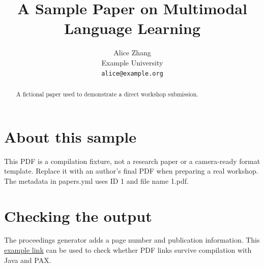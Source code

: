 \documentclass[11pt,a4paper]{article}
\title{A Sample Paper on Multimodal Language Learning}
\author{Alice Zhang\\Example University\\\texttt{alice@example.org}}
\date{}
\begin{document}
\maketitle
\thispagestyle{empty}
\begin{abstract}
A fictional paper used to demonstrate a direct workshop submission.
\end{abstract}
\section{About this sample}
This PDF is a compilation fixture, not a research paper or a camera-ready
format template. Replace it with an author's final PDF when preparing a real
workshop. The metadata in papers.yml uses ID 1 and file name 1.pdf.
\section{Checking the output}
The proceedings generator adds a page number and publication information.
This \href{https://example.org}{example link} can be used to check whether
PDF links survive compilation with Java and PAX.
\end{document}
